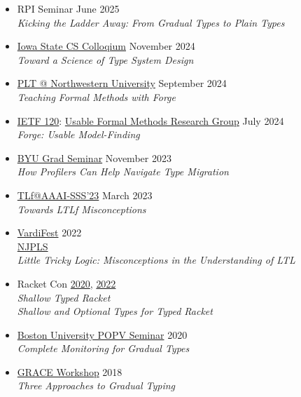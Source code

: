 \documentclass[11pt]{article}
\begin{document}
\begin{itemize}
  \item
    {RPI Seminar} \hfill June 2025 \\
    \emph{Kicking the Ladder Away: From Gradual Types to Plain Types}
  \item
    \href{https://www.cs.iastate.edu/event/2024/cs-colloquium-dr-ben-greenman}{Iowa State CS Colloqium} \hfill November 2024 \\
    \emph{Toward a Science of Type System Design}
  \item
    \href{https://plt.cs.northwestern.edu/}{PLT @ Northwestern University} \hfill September 2024 \\
    \emph{Teaching Formal Methods with Forge}
  \item
    \href{https://www.ietf.org/meeting/120/}{IETF 120}: \href{https://datatracker.ietf.org/meeting/120/materials/agenda-120-ufmrg-03}{Usable Formal Methods Research Group} \hfill July 2024 \\
    \emph{Forge: Usable Model-Finding}
  \item
    \href{https://cs.byu.edu/events/seminar-series/}{BYU Grad Seminar} \hfill November 2023 \\
    \emph{How Profilers Can Help Navigate Type Migration}
  \item
    \href{https://ltlf-symposium.github.io/}{TLf@AAAI-SSS'23} \hfill March 2023 \\
    \emph{Towards LTLf Misconceptions}
  \item
    \href{https://vardifest.github.io}{VardiFest} \hfill 2022\\
    \href{http://njpls.org/oct22.html}{NJPLS} \\
    \emph{Little Tricky Logic: Misconceptions in the Understanding of LT\/L}
  \item
    Racket Con \hfill \href{https://con.racket-lang.org/2020}{2020}, \href{https://con.racket-lang.org/2022}{2022}\\
    \emph{Shallow Typed Racket} \\
    \emph{Shallow and Optional Types for Typed Racket}
  \item
    \href{https://www.bu.edu/cs/research/popv/seminar/}{Boston University POPV Seminar} \hfill {2020}\\
    \emph{Complete Monitoring for Gradual Types}
  \item
    \href{https://2018.splashcon.org/track/grace-2018-papers}{GRACE Workshop} \hfill 2018\\
    \emph{Three Approaches to Gradual Typing}
\end{itemize}
\end{document}
